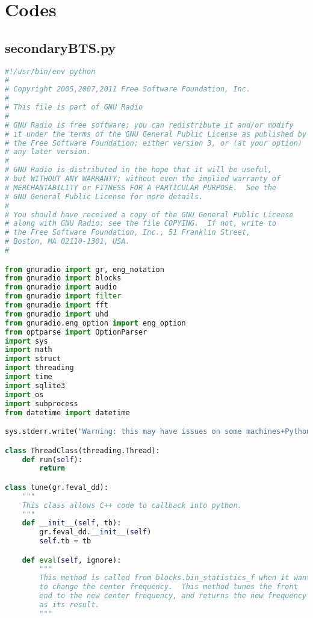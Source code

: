 \chapter{Codes}

\section{secondaryBTS.py}
\begin{lstlisting}[language=Python]
#!/usr/bin/env python
#
# Copyright 2005,2007,2011 Free Software Foundation, Inc.
#
# This file is part of GNU Radio
#
# GNU Radio is free software; you can redistribute it and/or modify
# it under the terms of the GNU General Public License as published by
# the Free Software Foundation; either version 3, or (at your option)
# any later version.
#
# GNU Radio is distributed in the hope that it will be useful,
# but WITHOUT ANY WARRANTY; without even the implied warranty of
# MERCHANTABILITY or FITNESS FOR A PARTICULAR PURPOSE.  See the
# GNU General Public License for more details.
#
# You should have received a copy of the GNU General Public License
# along with GNU Radio; see the file COPYING.  If not, write to
# the Free Software Foundation, Inc., 51 Franklin Street,
# Boston, MA 02110-1301, USA.
#

from gnuradio import gr, eng_notation
from gnuradio import blocks
from gnuradio import audio
from gnuradio import filter
from gnuradio import fft
from gnuradio import uhd
from gnuradio.eng_option import eng_option
from optparse import OptionParser
import sys
import math
import struct
import threading
import time
import sqlite3
import os
import subprocess
from datetime import datetime

sys.stderr.write("Warning: this may have issues on some machines+Python version combinations to seg fault due to the callback in bin_statitics.\n\n")

class ThreadClass(threading.Thread):
    def run(self):
        return

class tune(gr.feval_dd):
    """
    This class allows C++ code to callback into python.
    """
    def __init__(self, tb):
        gr.feval_dd.__init__(self)
        self.tb = tb

    def eval(self, ignore):
        """
        This method is called from blocks.bin_statistics_f when it wants
        to change the center frequency.  This method tunes the front
        end to the new center frequency, and returns the new frequency
        as its result.
        """


\end{lstlisting}
